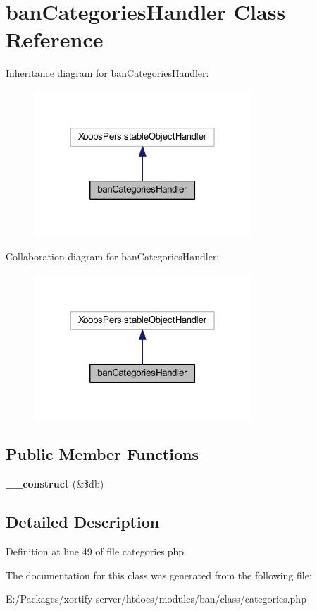 \hypertarget{classban_categories_handler}{\section{ban\-Categories\-Handler Class Reference}
\label{classban_categories_handler}
}


Inheritance diagram for ban\-Categories\-Handler\-:
\nopagebreak
\begin{figure}[H]
\begin{center}
\leavevmode
\includegraphics[width=232pt]{classban_categories_handler__inherit__graph}
\end{center}
\end{figure}


Collaboration diagram for ban\-Categories\-Handler\-:
\nopagebreak
\begin{figure}[H]
\begin{center}
\leavevmode
\includegraphics[width=232pt]{classban_categories_handler__coll__graph}
\end{center}
\end{figure}
\subsection*{Public Member Functions}
\begin{DoxyCompactItemize}
\item 
\hypertarget{classban_categories_handler_aaf2ef772755ec6f361d44e16cc9ffd69}{{\bfseries \-\_\-\-\_\-construct} (\&\$db)}\label{classban_categories_handler_aaf2ef772755ec6f361d44e16cc9ffd69}

\end{DoxyCompactItemize}


\subsection{Detailed Description}


Definition at line 49 of file categories.\-php.



The documentation for this class was generated from the following file\-:\begin{DoxyCompactItemize}
\item 
E\-:/\-Packages/xortify server/htdocs/modules/ban/class/categories.\-php\end{DoxyCompactItemize}
